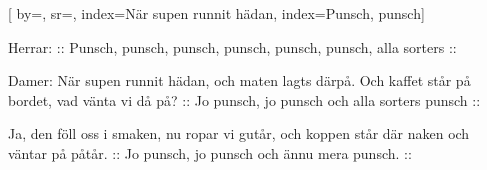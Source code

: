 

[ 		%
	by={},					%
	sr={},					%
	index={När supen runnit hädan}, %
	index={Punsch, punsch}]						%
	

\beginverse*						%
Herrar:
:: Punsch, punsch,
punsch, punsch,
punsch, punsch,
alla sorters ::
\endverse							%

\beginverse*						%
Damer:
När supen runnit hädan,
och maten lagts därpå.
Och kaffet står på bordet,
vad vänta vi då på?
:: Jo punsch, jo punsch
och alla sorters punsch ::

Ja, den föll oss i smaken,
nu ropar vi gutår,
och koppen står där naken
och väntar på påtår.
:: Jo punsch, jo punsch
och ännu mera punsch. ::
\endverse							%

\endsong							%